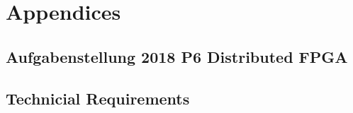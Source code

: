 %
%
\chapter{Appendices}\label{chp:appendices}

\section{Aufgabenstellung 2018 P6 Distributed FPGA} \label{app:aufgabenstellung}


\section{Technicial Requirements} \label{app:technicial_requirements}


